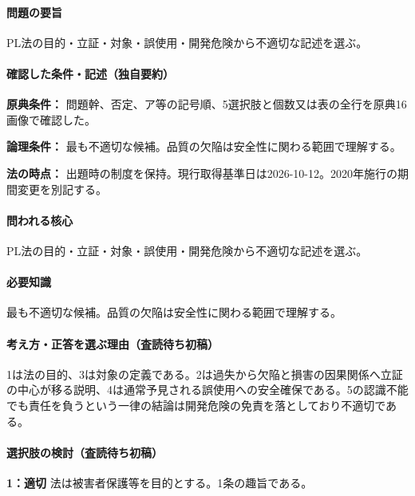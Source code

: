 \paragraph{問題の要旨} PL法の目的・立証・対象・誤使用・開発危険から不適切な記述を選ぶ。

\paragraph{確認した条件・記述（独自要約）}\mbox{}\par

\noindent\textbf{原典条件：} 問題幹、否定、ア等の記号順、5選択肢と個数又は表の全行を原典16画像で確認した。\par

\noindent\textbf{論理条件：} 最も不適切な候補。品質の欠陥は安全性に関わる範囲で理解する。\par

\noindent\textbf{法の時点：} 出題時の制度を保持。現行取得基準日は2026-10-12。2020年施行の期間変更を別記する。\par

\paragraph{問われる核心} PL法の目的・立証・対象・誤使用・開発危険から不適切な記述を選ぶ。

\paragraph{必要知識} 最も不適切な候補。品質の欠陥は安全性に関わる範囲で理解する。

\paragraph{考え方・正答を選ぶ理由（査読待ち初稿）} 1は法の目的、3は対象の定義である。2は過失から欠陥と損害の因果関係へ立証の中心が移る説明、4は通常予見される誤使用への安全確保である。5の認識不能でも責任を負うという一律の結論は開発危険の免責を落としており不適切である。

\paragraph{選択肢の検討（査読待ち初稿）}\mbox{}\par

\noindent\textbf{1：適切} 法は被害者保護等を目的とする。1条の趣旨である。\par

